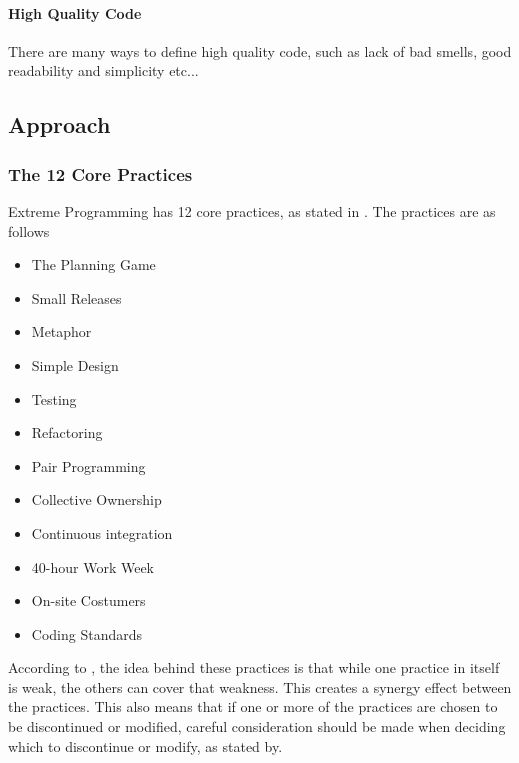 \paragraph{High Quality Code}
There are many ways to define high quality code, such as lack of bad smells, good readability and simplicity etc...




%

\subsection{Approach}
\subsubsection{The 12 Core Practices}
Extreme Programming has 12 core practices, as stated in \citep{xp:explained}. The practices are as follows

\begin{itemize}
\item The Planning Game
\item Small Releases
\item Metaphor
\item Simple Design
\item Testing
\item Refactoring
\item Pair Programming
\item Collective Ownership
\item Continuous integration
\item 40-hour Work Week
\item On-site Costumers
\item Coding Standards
\end{itemize}

According to \citep[p. 53]{xp:explained}, the idea behind these practices is that while one practice in itself is weak, the others can cover that weakness. This creates a synergy effect between the practices. This also means that if one or more of the practices are chosen to be discontinued or modified, careful consideration should be made when deciding which to discontinue or modify, as stated by.

